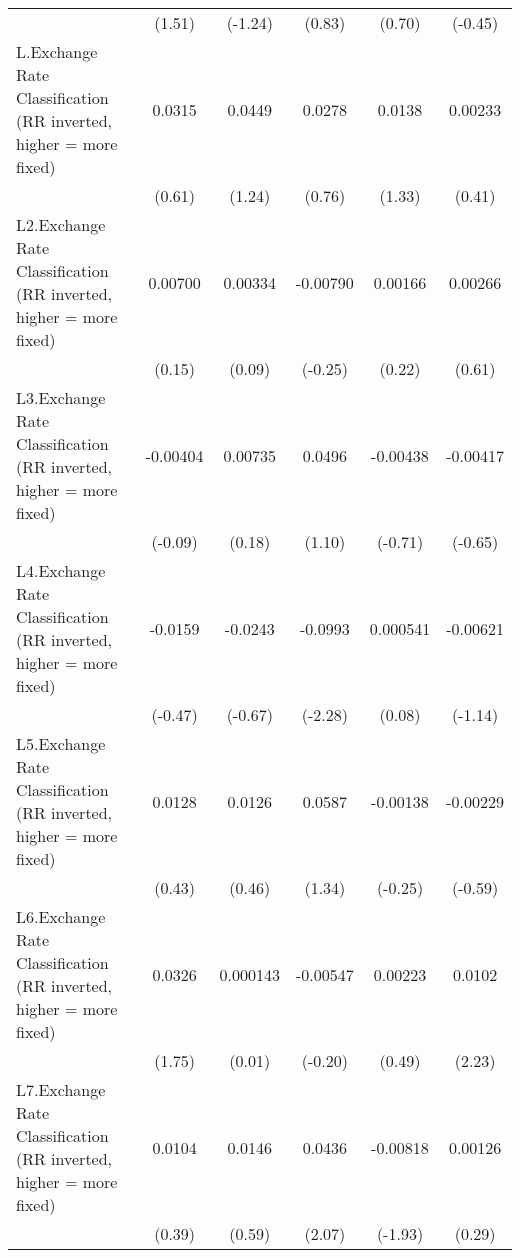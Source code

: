 {\begin{longtable}{l*{5}{c}}
                &   (1.51)         &  (-1.24)         &   (0.83)         &   (0.70)         &  (-0.45)         \\
[1em]
L.Exchange Rate Classification (RR inverted, higher = more fixed)&   0.0315         &   0.0449         &   0.0278         &   0.0138         &  0.00233         \\
                &   (0.61)         &   (1.24)         &   (0.76)         &   (1.33)         &   (0.41)         \\
[1em]
L2.Exchange Rate Classification (RR inverted, higher = more fixed)&  0.00700         &  0.00334         & -0.00790         &  0.00166         &  0.00266         \\
                &   (0.15)         &   (0.09)         &  (-0.25)         &   (0.22)         &   (0.61)         \\
[1em]
L3.Exchange Rate Classification (RR inverted, higher = more fixed)& -0.00404         &  0.00735         &   0.0496         & -0.00438         & -0.00417         \\
                &  (-0.09)         &   (0.18)         &   (1.10)         &  (-0.71)         &  (-0.65)         \\
[1em]
L4.Exchange Rate Classification (RR inverted, higher = more fixed)&  -0.0159         &  -0.0243         &  -0.0993\sym{*}  & 0.000541         & -0.00621         \\
                &  (-0.47)         &  (-0.67)         &  (-2.28)         &   (0.08)         &  (-1.14)         \\
[1em]
L5.Exchange Rate Classification (RR inverted, higher = more fixed)&   0.0128         &   0.0126         &   0.0587         & -0.00138         & -0.00229         \\
                &   (0.43)         &   (0.46)         &   (1.34)         &  (-0.25)         &  (-0.59)         \\
[1em]
L6.Exchange Rate Classification (RR inverted, higher = more fixed)&   0.0326         & 0.000143         & -0.00547         &  0.00223         &   0.0102\sym{*}  \\
                &   (1.75)         &   (0.01)         &  (-0.20)         &   (0.49)         &   (2.23)         \\
[1em]
L7.Exchange Rate Classification (RR inverted, higher = more fixed)&   0.0104         &   0.0146         &   0.0436\sym{*}  & -0.00818         &  0.00126         \\
                &   (0.39)         &   (0.59)         &   (2.07)         &  (-1.93)         &   (0.29)         \\

\end{longtable}}
